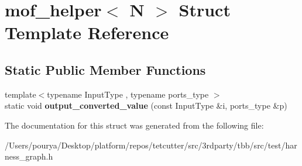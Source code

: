 \hypertarget{structmof__helper}{}\section{mof\+\_\+helper$<$ N $>$ Struct Template Reference}
\label{structmof__helper}
\subsection*{Static Public Member Functions}
\begin{DoxyCompactItemize}
\item 
\hypertarget{structmof__helper_a77de4607930c7aeafb99b767877da2a4}{}{\footnotesize template$<$typename Input\+Type , typename ports\+\_\+type $>$ }\\static void {\bfseries output\+\_\+converted\+\_\+value} (const Input\+Type \&i, ports\+\_\+type \&p)\label{structmof__helper_a77de4607930c7aeafb99b767877da2a4}

\end{DoxyCompactItemize}


The documentation for this struct was generated from the following file\+:\begin{DoxyCompactItemize}
\item 
/\+Users/pourya/\+Desktop/platform/repos/tetcutter/src/3rdparty/tbb/src/test/harness\+\_\+graph.\+h\end{DoxyCompactItemize}
